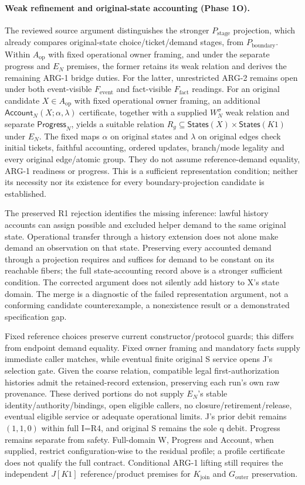\documentclass[11pt,a4paper]{article}
\theoremstyle{definition}
\theoremstyle{remark}
\begin{document}
\paragraph{Weak refinement and original-state accounting (Phase 1O).} The reviewed source argument distinguishes the stronger $P_{\mathrm{stage}}$ projection, which already compares original-state choice/ticket/demand stages, from $P_{\mathrm{boundary}}$. Within $A_{\mathrm{op}}$ with fixed operational owner framing, and under the separate progress and $E_N$ premises, the former retains its weak relation and derives the remaining ARG-1 bridge duties. For the latter, unrestricted ARG-2 remains open under both event-visible $F_{\mathrm{event}}$ and fact-visible $F_{\mathrm{fact}}$ readings. For an original candidate $X\in A_{\mathrm{op}}$ with fixed operational owner framing, an additional $\mathsf{Account}_N(X;\alpha,\lambda)$ certificate, together with a supplied $W_N^\sigma$ weak relation and separate $\mathsf{Progress}_N$, yields a suitable relation $R_g\subseteq\mathsf{States}(X)\times\mathsf{States}(K1)$ under $E_N$. The fixed maps $\alpha$ on original states and $\lambda$ on original edges check initial tickets, faithful accounting, ordered updates, branch/mode legality and every original edge/atomic group. They do not assume reference-demand equality, ARG-1 readiness or progress. This is a sufficient representation condition; neither its necessity nor its existence for every boundary-projection candidate is established.

The preserved R1 rejection identifies the missing inference: lawful history accounts can assign possible and excluded helper demand to the same original state. Operational transfer through a history extension does not alone make demand an observation on that state. Preserving every accounted demand through a projection requires and suffices for demand to be constant on its reachable fibers; the full state-accounting record above is a stronger sufficient condition. The corrected argument does not silently add history to X's state domain. The merge is a diagnostic of the failed representation argument, not a conforming candidate counterexample, a nonexistence result or a demonstrated specification gap.

Fixed reference choices preserve current constructor/protocol guards; this differs from endpoint demand equality. Fixed owner framing and mandatory facts supply immediate caller matches, while eventual finite original S service opens J's selection gate. Given the coarse relation, compatible legal first-authorization histories admit the retained-record extension, preserving each run's own raw provenance. These derived portions do not supply $E_N$'s stable identity/authority/bindings, open eligible callers, no closure/retirement/release, eventual eligible service or adequate operational limits. J's prior debit remains $(1,1,0)$ within full I=R4, and original S remains the sole q debit. Progress remains separate from safety. Full-domain W, Progress and Account, when supplied, restrict configuration-wise to the residual profile; a profile certificate does not qualify the full contract. Conditional ARG-1 lifting still requires the independent $J[K1]$ reference/product premises for $K_{\mathrm{join}}$ and $G_{\mathrm{outer}}$ preservation.
\end{document}
